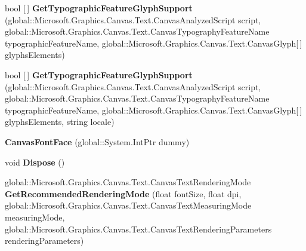 \begin{DoxyCompactItemize}
bool \mbox{[}$\,$\mbox{]} {\bfseries Get\+Typographic\+Feature\+Glyph\+Support} (global\+::\+Microsoft.\+Graphics.\+Canvas.\+Text.\+Canvas\+Analyzed\+Script script, global\+::\+Microsoft.\+Graphics.\+Canvas.\+Text.\+Canvas\+Typography\+Feature\+Name typographic\+Feature\+Name, global\+::\+Microsoft.\+Graphics.\+Canvas.\+Text.\+Canvas\+Glyph\mbox{[}$\,$\mbox{]} glyphs\+Elements)
\item 
\mbox{\label{class_microsoft_1_1_graphics_1_1_canvas_1_1_text_1_1_canvas_font_face_ae0d5c7ee944b1f25cd4fb4678a0b2f3f}} 
bool \mbox{[}$\,$\mbox{]} {\bfseries Get\+Typographic\+Feature\+Glyph\+Support} (global\+::\+Microsoft.\+Graphics.\+Canvas.\+Text.\+Canvas\+Analyzed\+Script script, global\+::\+Microsoft.\+Graphics.\+Canvas.\+Text.\+Canvas\+Typography\+Feature\+Name typographic\+Feature\+Name, global\+::\+Microsoft.\+Graphics.\+Canvas.\+Text.\+Canvas\+Glyph\mbox{[}$\,$\mbox{]} glyphs\+Elements, string locale)
\item 
\mbox{\label{class_microsoft_1_1_graphics_1_1_canvas_1_1_text_1_1_canvas_font_face_aef189d914adb999be992b177e5789e32}} 
{\bfseries Canvas\+Font\+Face} (global\+::\+System.\+Int\+Ptr dummy)
\item 
\mbox{\label{class_microsoft_1_1_graphics_1_1_canvas_1_1_text_1_1_canvas_font_face_a929e502ef0c2b824b2a59f1dabbe2fc8}} 
void {\bfseries Dispose} ()
\item 
\mbox{\label{class_microsoft_1_1_graphics_1_1_canvas_1_1_text_1_1_canvas_font_face_a20dec27603e0f42c6754d98b9b3494dc}} 
global\+::\+Microsoft.\+Graphics.\+Canvas.\+Text.\+Canvas\+Text\+Rendering\+Mode {\bfseries Get\+Recommended\+Rendering\+Mode} (float font\+Size, float dpi, global\+::\+Microsoft.\+Graphics.\+Canvas.\+Text.\+Canvas\+Text\+Measuring\+Mode measuring\+Mode, global\+::\+Microsoft.\+Graphics.\+Canvas.\+Text.\+Canvas\+Text\+Rendering\+Parameters rendering\+Parameters)
\item 
\mbox{\label{class_microsoft_1_1_graphics_1_1_canvas_1_1_text_1_1_canvas_font_face_a7ba21595666b01311efff611f0ddc72c}} 

\end{DoxyCompactItemize}

